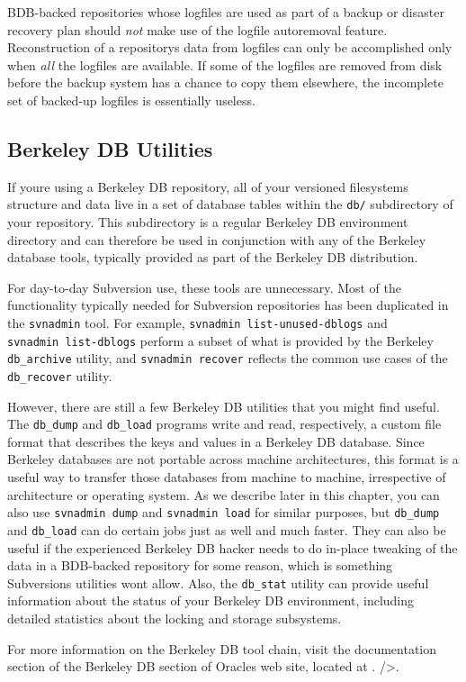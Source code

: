 BDB-backed repositories whose logfiles are used as part of a backup or
disaster recovery plan should \emph{not} make use of the logfile
autoremoval feature. Reconstruction of a repository\textquotesingle s
data from logfiles can only be accomplished only when \emph{all} the
logfiles are available. If some of the logfiles are removed from disk
before the backup system has a chance to copy them elsewhere, the
incomplete set of backed-up logfiles is essentially useless.

\subsection{Berkeley DB
Utilities}\label{svn.berkeleydb.maintenance.bdbutil}

If you\textquotesingle re using a Berkeley DB repository, all of your
versioned filesystem\textquotesingle s structure and data live in a set
of database tables within the \texttt{db/} subdirectory of your
repository. This subdirectory is a regular Berkeley DB environment
directory and can therefore be used in conjunction with any of the
Berkeley database tools, typically provided as part of the Berkeley DB
distribution.

For day-to-day Subversion use, these tools are unnecessary. Most of the
functionality typically needed for Subversion repositories has been
duplicated in the \texttt{svnadmin} tool. For example,
\texttt{svnadmin\ list-unused-dblogs} and \texttt{svnadmin\ list-dblogs}
perform a subset of what is provided by the Berkeley
\texttt{db\_archive} utility, and \texttt{svnadmin\ recover} reflects
the common use cases of the \texttt{db\_recover} utility.

However, there are still a few Berkeley DB utilities that you might find
useful. The \texttt{db\_dump} and \texttt{db\_load} programs write and
read, respectively, a custom file format that describes the keys and
values in a Berkeley DB database. Since Berkeley databases are not
portable across machine architectures, this format is a useful way to
transfer those databases from machine to machine, irrespective of
architecture or operating system. As we describe later in this chapter,
you can also use \texttt{svnadmin\ dump} and \texttt{svnadmin\ load} for
similar purposes, but \texttt{db\_dump} and \texttt{db\_load} can do
certain jobs just as well and much faster. They can also be useful if
the experienced Berkeley DB hacker needs to do in-place tweaking of the
data in a BDB-backed repository for some reason, which is something
Subversion\textquotesingle s utilities won\textquotesingle t allow.
Also, the \texttt{db\_stat} utility can provide useful information about
the status of your Berkeley DB environment, including detailed
statistics about the locking and storage subsystems.

For more information on the Berkeley DB tool chain, visit the
documentation section of the Berkeley DB section of
Oracle\textquotesingle s web site, located at
\href{https://docs.oracle.com/cd/E17275_01/html/api_reference/C/utilities.html}{}.
/\textgreater.

